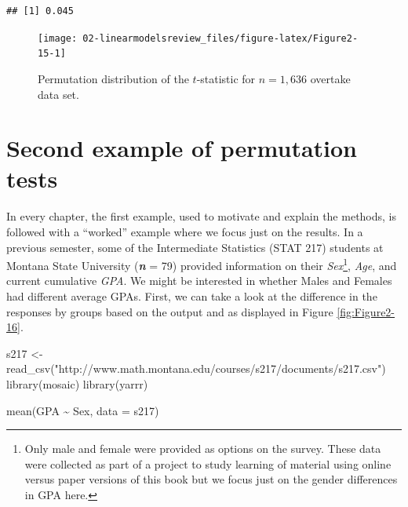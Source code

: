\documentclass[
]{book}
\newenvironment{Shaded}{\begin{snugshade}}{\end{snugshade}}
\newcommand{\AttributeTok}[1]{\textcolor[rgb]{0.77,0.63,0.00}{#1}}
\newcommand{\FunctionTok}[1]{\textcolor[rgb]{0.00,0.00,0.00}{#1}}
\newcommand{\NormalTok}[1]{#1}
\newcommand{\OtherTok}[1]{\textcolor[rgb]{0.56,0.35,0.01}{#1}}
\newcommand{\SpecialCharTok}[1]{\textcolor[rgb]{0.00,0.00,0.00}{#1}}
\newcommand{\StringTok}[1]{\textcolor[rgb]{0.31,0.60,0.02}{#1}}
\begin{document}
\begin{verbatim}
## [1] 0.045
\end{verbatim}



\begin{figure}[ht!]

{\centering \texttt{[image: 02-linearmodelsreview\_files/figure-latex/Figure2-15-1]} 

}

\caption{Permutation distribution of the \(t\)-statistic for \(n = 1,636\) overtake data set.}\label{fig:Figure2-15}
\end{figure}

\newpage

\hypertarget{section2-7}{%
\section{Second example of permutation tests}\label{section2-7}}

In every chapter, the first example, used to motivate and explain
the methods, is followed with a ``worked'' example where we focus just on the
results. In a
previous semester, some of the Intermediate Statistics (STAT 217) students at Montana State University (\textbf{\emph{n}} = 79) provided
information on their \emph{Sex}\footnote{Only male and female were provided as options on the survey. These data were collected as part of a project to study learning of material using online versus paper versions of this book but we focus just on the gender differences in GPA here.}, \emph{Age}, and current cumulative \emph{GPA}. We might be
interested in whether Males and Females had different average GPAs. First,
we can take a look at the difference in the responses by groups based on the
output and as displayed in Figure \ref{fig:Figure2-16}.

\begin{Shaded}
\begin{Highlighting}[]
\NormalTok{s217 }\OtherTok{\textless{}{-}} \FunctionTok{read\_csv}\NormalTok{(}\StringTok{"http://www.math.montana.edu/courses/s217/documents/s217.csv"}\NormalTok{)}
\FunctionTok{library}\NormalTok{(mosaic)}
\FunctionTok{library}\NormalTok{(yarrr)}
\end{Highlighting}
\end{Shaded}

\begin{Shaded}
\begin{Highlighting}[]
\FunctionTok{mean}\NormalTok{(GPA }\SpecialCharTok{\textasciitilde{}}\NormalTok{ Sex, }\AttributeTok{data =}\NormalTok{ s217)}
\end{Highlighting}
\end{Shaded}
\end{document}
